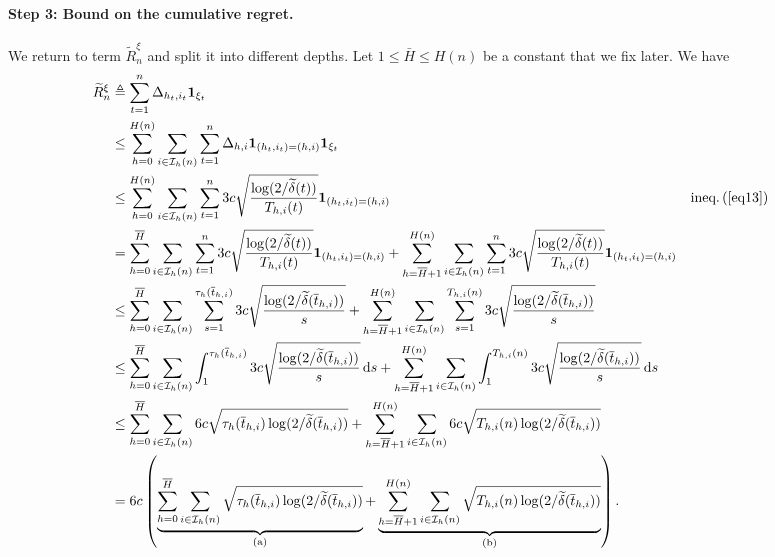 \paragraph{Step 3: Bound on the cumulative regret.}
We return to  term $\tilde{R}_n^{\xi}$ and split it into different depths. Let $1\leq \bar{H} \leq H(n)$ be a constant that we  fix later. We have
\begin{align*}
    \widetilde{R}_n^{\xi} &\triangleq \sum_{t=1}^n \Delta_{h_t,i_t} {\bf 1}_{\xi_t} \\
                              &\leq \sum_{h=0}^{H(n)}\sum_{i\in\mathcal{I}_h(n)}\sum_{t=1}^n \Delta_{h,i} {\bf 1}_{(h_t,i_t)=(h,i)} {\bf 1}_{\xi_t} \\
                              &\leq \sum_{h=0}^{H(n)}\sum_{i\in\mathcal{I}_h(n)}\sum_{t=1}^n 3c\sqrt{\frac{\operatorname{log}(2/\widetilde{\delta}(t))}{T_{h,i}(t)}} {\bf 1}_{(h_t,i_t)=(h,i)} && \text{ineq.\,(\ref{eq13})} \\
                              &= \sum_{h=0}^{\overline{H}}\sum_{i\in\mathcal{I}_h(n)}\sum_{t=1}^n 3c\sqrt{\frac{\operatorname{log}(2/\widetilde{\delta}(t))}{T_{h,i}(t)}} {\bf 1}_{(h_t,i_t)=(h,i)} + \sum_{h=\overline{H}+1}^{H(n)}\sum_{i\in\mathcal{I}_h(n)}\sum_{t=1}^n 3c\sqrt{\frac{\operatorname{log}(2/\widetilde{\delta}(t))}{T_{h,i}(t)}} {\bf 1}_{(h_t,i_t)=(h,i)} \\
                              &\leq \sum_{h=0}^{\overline{H}}\sum_{i\in\mathcal{I}_h(n)}\sum_{s=1}^{\tau_h(\overline{t}_{h,i})} 3c\sqrt{\frac{\operatorname{log}(2/\widetilde{\delta}(\overline{t}_{h,i}))}{s}} + \sum_{h=\overline{H}+1}^{H(n)}\sum_{i\in\mathcal{I}_h(n)}\sum_{s=1}^{T_{h,i}(n)} 3c\sqrt{\frac{\operatorname{log}(2/\widetilde{\delta}(\overline{t}_{h,i}))}{s}} \\
                              &\leq \sum_{h=0}^{\overline{H}}\sum_{i\in\mathcal{I}_h(n)}\int_{1}^{\tau_h(\overline{t}_{h,i})} 3c\sqrt{\frac{\operatorname{log}(2/\widetilde{\delta}(\overline{t}_{h,i}))}{s}} \, \mathrm{d}s + \sum_{h=\overline{H}+1}^{H(n)}\sum_{i\in\mathcal{I}_h(n)}\int_{1}^{T_{h,i}(n)} 3c\sqrt{\frac{\operatorname{log}(2/\widetilde{\delta}(\overline{t}_{h,i}))}{s}} \, \mathrm{d}s \\
                              &\leq \sum_{h=0}^{\overline{H}}\sum_{i\in\mathcal{I}_h(n)} 6c\sqrt{\tau_h(\overline{t}_{h,i})\operatorname{log}(2/\widetilde{\delta}(\overline{t}_{h,i}))} + \sum_{h=\overline{H}+1}^{H(n)}\sum_{i\in\mathcal{I}_h(n)} 6c\sqrt{T_{h,i}(n)\operatorname{log}(2/\widetilde{\delta}(\overline{t}_{h,i}))} \\
                              &= 6c\left(\underbrace{\sum_{h=0}^{\overline{H}}\sum_{i\in\mathcal{I}_h(n)} \sqrt{\tau_h(\overline{t}_{h,i})\operatorname{log}(2/\widetilde{\delta}(\overline{t}_{h,i}))}}_\text{(a)} + \underbrace{\sum_{h=\overline{H}+1}^{H(n)}\sum_{i\in\mathcal{I}_h(n)} \sqrt{T_{h,i}(n)\operatorname{log}(2/\widetilde{\delta}(\overline{t}_{h,i}))}}_\text{(b)}\right).
\end{align*}
